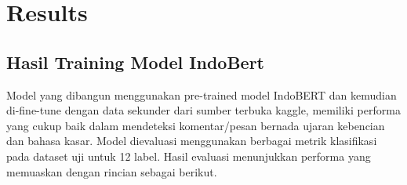 \documentclass[journal,article,submit,pdftex,moreauthors]{Definitions/mdpi}
\begin{document}
\section{Results}
\subsection{Hasil Training Model IndoBert}

Model yang dibangun menggunakan pre-trained model IndoBERT dan kemudian di-fine-tune dengan data sekunder dari sumber terbuka kaggle, memiliki performa yang cukup baik dalam mendeteksi komentar/pesan bernada ujaran kebencian dan bahasa kasar. Model dievaluasi menggunakan berbagai metrik klasifikasi pada dataset uji untuk 12 label. Hasil evaluasi menunjukkan performa yang memuaskan dengan rincian sebagai berikut.











\end{document}
